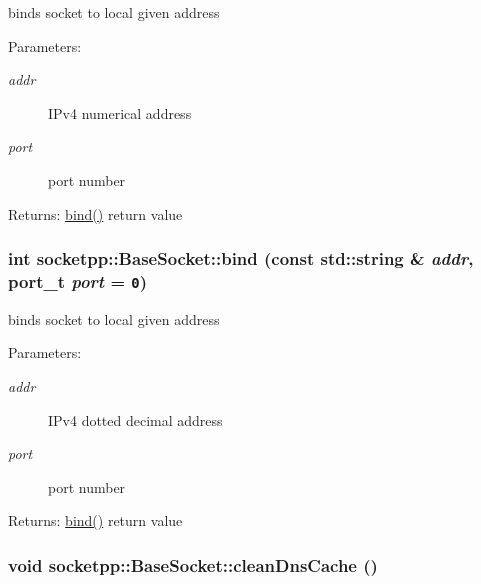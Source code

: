 binds socket to local given address 

\begin{Desc}
\item[Parameters:]
\begin{description}
\item[{\em addr}]IPv4 numerical address \item[{\em port}]port number \end{description}
\end{Desc}
\begin{Desc}
\item[Returns:]\hyperlink{classsocketpp_1_1BaseSocket_78c2a8e6a5c7dfbc708c9cd637e88e51}{bind()} return value \end{Desc}
\hypertarget{classsocketpp_1_1BaseSocket_78c2a8e6a5c7dfbc708c9cd637e88e51}{
\subsubsection[{bind}]{\setlength{\rightskip}{0pt plus 5cm}int socketpp::BaseSocket::bind (const std::string \& {\em addr}, \/  {\bf port\_\-t} {\em port} = {\tt 0})}}
\label{classsocketpp_1_1BaseSocket_78c2a8e6a5c7dfbc708c9cd637e88e51}


binds socket to local given address 

\begin{Desc}
\item[Parameters:]
\begin{description}
\item[{\em addr}]IPv4 dotted decimal address \item[{\em port}]port number \end{description}
\end{Desc}
\begin{Desc}
\item[Returns:]\hyperlink{classsocketpp_1_1BaseSocket_78c2a8e6a5c7dfbc708c9cd637e88e51}{bind()} return value \end{Desc}
\hypertarget{classsocketpp_1_1BaseSocket_f3a4c01a7bf911460296a873ce0913da}{
\subsubsection[{cleanDnsCache}]{\setlength{\rightskip}{0pt plus 5cm}void socketpp::BaseSocket::cleanDnsCache ()}}
\label{classsocketpp_1_1BaseSocket_f3a4c01a7bf911460296a873ce0913da}


